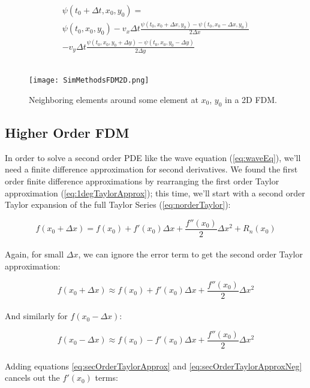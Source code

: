 {\begin{multline}\label{eq:advection2Dapprox}
   \psi(t_{0} + \Delta  t,  x_{0}, y_{0}) =\\
   \psi(t_{0}, x_{0}, y_{0}) -v_{x}\Delta t\frac{\psi(t_{0}, x_{0} + \Delta  x, y_{0})-\psi(t_{0}, x_{0}-\Delta x, y_{0})}{2\Delta  x}\\
   -v_{y}\Delta t\frac{\psi(t_{0}, x_{0}, y_{0} + \Delta  y)-\psi(t_{0}, x_{0}, y_{0}-\Delta y)}{2\Delta  y} 
\end{multline}
\\
\begin{figure}
  \texttt{[image: SimMethodsFDM2D.png]}
  \caption{Neighboring elements around some element at $x_{0}$, $y_{0}$ in a 2D FDM.}
  \label{fig:SimMethodsFDM2D}
\end{figure}

\subsection{Higher Order FDM}

In order to solve a second order PDE like the wave equation (\ref{eq:waveEq}), we'll need a finite difference approximation for second derivatives.  We found the first order finite difference approximations by rearranging the first order Taylor approximation (\ref{eq:1degTaylorApprox}); this time, we'll start with a second order Taylor expansion of the full Taylor Series (\ref{eq:norderTaylor}):

 \begin{equation}
  f(x_{0} + \Delta  x) = f(x_{0}) + f'(x_{0})\Delta  x + \frac{f''(x_{0})}{2}\Delta  x^{2} + R_{n}(x_{0})
  \end{equation}
    \\
  Again, for small $\Delta  x$, we can ignore the error term to get the second order Taylor approximation:
  
   \begin{equation}\label{eq:secOrderTaylorApprox}
  f(x_{0} + \Delta  x) \approx f(x_{0}) + f'(x_{0})\Delta  x + \frac{f''(x_{0})}{2}\Delta  x^{2}
  \end{equation}
    \\
  And similarly for  $f(x_{0} - \Delta  x)$:
  
     \begin{equation}\label{eq:secOrderTaylorApproxNeg}
  f(x_{0} - \Delta  x) \approx f(x_{0}) - f'(x_{0})\Delta  x + \frac{f''(x_{0})}{2}\Delta  x^{2}
  \end{equation}
    \\
  Adding equations \ref{eq:secOrderTaylorApprox} and \ref{eq:secOrderTaylorApproxNeg} cancels out the $f'(x_{0})$ terms:
  
}

